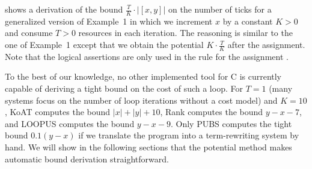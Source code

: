 \documentclass[nocopyrightspace,preprint,pldi]{sigplanconf-pldi15}
\newcommand{\iffull}[2]{\ifx\fullversion\undefined{#2}\else{#1}\fi}
\newcommand{\pref}[1]{\prettyref{#1}}
\begin{document}
\pref{fig:ex1} shows a derivation of the bound
$\frac{T}{K}{\cdot}|[x,y]|$ on the number of ticks for a generalized
version of Example~1 in which we increment $x$ by a constant $K>0$ and
consume $T>0$ resources in each iteration.  The reasoning is similar
to the one of Example~1 except that we obtain the potential
$K{\cdot}\frac{T}{K}$ after the assignment.  Note that the logical
assertions are only used in the rule for the assignment
.

To the best of our knowledge, no other implemented tool for C is
currently capable of deriving a tight bound on the cost of such a
loop.  For $T=1$ (many systems focus on the number of loop iterations
without a cost model) and $K=10$, KoAT computes the bound $|x| + |y| +
10$, Rank computes the bound $y-x-7$, and LOOPUS computes the bound
$y-x-9$.  Only PUBS computes the tight bound $0.1(y-x)$ if we
translate the program into a term-rewriting system by
hand. We will show in the following sections that the
potential method makes automatic bound derivation straightforward.


\end{document}
